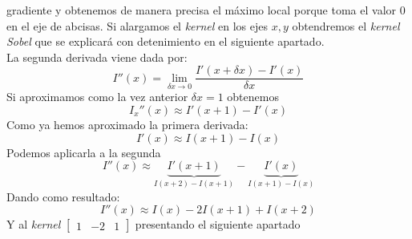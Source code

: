 gradiente y obtenemos de manera precisa el máximo local porque toma el
valor $0$ en el eje de abcisas. Si alargamos el \emph{kernel} en los
ejes $x, y$ obtendremos el \emph{kernel}
\emph{Sobel} que se explicará con detenimiento en el siguiente apartado. \\
La segunda derivada viene dada por:
\begin{equation*}
  I''(x) = \lim_{\delta x \to 0}\frac{I'(x+\delta x) - I'(x)}{\delta x}
\end{equation*}
Si aproximamos como la vez anterior $\delta x = 1$ obtenemos
\begin{equation*}
  I_x''(x) \approx I'(x + 1) - I'(x)
\end{equation*}
Como ya hemos aproximado la primera derivada:
\begin{equation*}
  I'(x) \approx I(x + 1) - I(x)
\end{equation*}
Podemos aplicarla a la segunda
\begin{equation*}
  I''(x) \approx \underbrace{I'(x + 1)}_{I(x + 2) - I(x + 1)} - \underbrace{I'(x)}_{I(x + 1) - I(x)}
\end{equation*}
Dando como resultado:
\begin{equation*}
  I''(x) \approx I(x) - 2I(x + 1) + I(x + 2)
\end{equation*}
Y al \emph{kernel} $\begin{bmatrix} 1 & -2 & 1 \end{bmatrix}$
presentando el siguiente apartado
